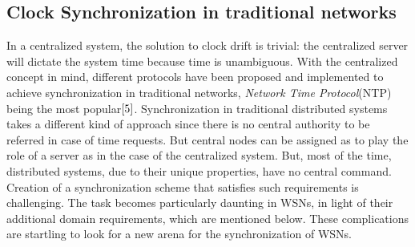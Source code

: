 \documentclass[journal]{IEEEtran}
\begin{document}
\subsection{\textbf{Clock Synchronization in traditional networks}}
\noindent In a centralized system, the solution to clock drift is
trivial: the centralized server will dictate the system time because
time is unambiguous. With the centralized concept in mind, different
protocols have been proposed and implemented to achieve
synchronization in traditional networks, \textit{Network Time Protocol}(NTP)
being the most popular$\cite{5}$.
\newline Synchronization in traditional distributed systems takes
a different kind of approach since there is no central authority to
be referred in case of time requests. But central nodes can be
assigned as to play the role of a server as in the case of the
centralized system. But, most of the time, distributed systems, due
to their unique properties, have no central command. Creation of a
synchronization scheme that satisfies such requirements is
challenging. The task becomes particularly daunting in WSNs, in
light of their additional domain requirements, which are mentioned
below. These complications are startling to look for a new arena for
the synchronization of WSNs.
\end{document}
